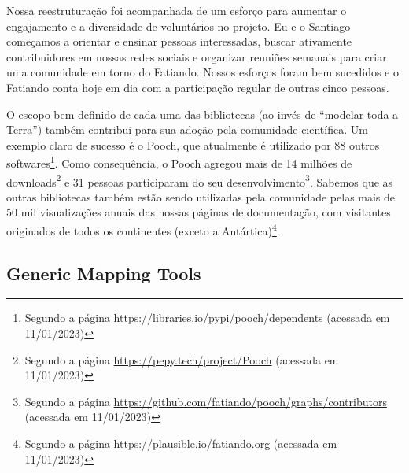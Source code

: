 \documentclass[10pt,a4paper,oneside]{book}
\begin{document}
Nossa reestruturação foi acompanhada de um esforço para aumentar o engajamento
e a diversidade de voluntários no projeto.
Eu e o Santiago começamos a orientar e ensinar pessoas interessadas, buscar
ativamente contribuidores em nossas redes sociais e organizar reuniões semanais
para criar uma comunidade em torno do Fatiando.
Nossos esforços foram bem sucedidos e o Fatiando conta hoje em dia com a
participação regular de outras cinco pessoas.

O escopo bem definido de cada uma das bibliotecas (ao invés de ``modelar
toda a Terra'') também contribui para sua adoção pela comunidade científica.
Um exemplo claro de sucesso é o Pooch, que atualmente é utilizado por 88 outros
softwares\footnote{Segundo a página
\url{https://libraries.io/pypi/pooch/dependents} (acessada em 11/01/2023)}.
Como consequência, o Pooch agregou mais de 14 milhões de downloads\footnote{Segundo a página
\url{https://pepy.tech/project/Pooch} (acessada em 11/01/2023)} e 31 pessoas
participaram do seu desenvolvimento\footnote{Segundo a página
\url{https://github.com/fatiando/pooch/graphs/contributors} (acessada em
11/01/2023)}.
Sabemos que as outras bibliotecas também estão sendo utilizadas pela comunidade
pelas mais de 50 mil visualizações anuais das nossas páginas de documentação,
com visitantes originados de todos os continentes (exceto a Antártica)\footnote{Segundo a página
\url{https://plausible.io/fatiando.org} (acessada em 11/01/2023)}.



\subsection{Generic Mapping Tools}
\label{sec_gmt}
\end{document}

